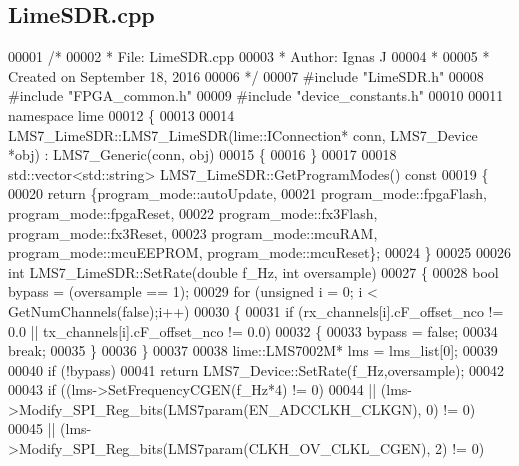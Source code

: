 \subsection{Lime\+S\+D\+R.\+cpp}
\label{LimeSDR_8cpp_source}

\begin{DoxyCode}
00001 \textcolor{comment}{/*}
00002 \textcolor{comment}{ * File:   LimeSDR.cpp}
00003 \textcolor{comment}{ * Author: Ignas J}
00004 \textcolor{comment}{ *}
00005 \textcolor{comment}{ * Created on September 18, 2016}
00006 \textcolor{comment}{ */}
00007 \textcolor{preprocessor}{#include "LimeSDR.h"}
00008 \textcolor{preprocessor}{#include "FPGA_common.h"}
00009 \textcolor{preprocessor}{#include "device_constants.h"}
00010 
00011 \textcolor{keyword}{namespace }lime
00012 \{
00013 
00014 LMS7_LimeSDR::LMS7_LimeSDR(lime::IConnection* conn, LMS7_Device *obj) : 
      LMS7_Generic(conn, obj)
00015 \{
00016 \}
00017 
00018 std::vector<std::string> LMS7_LimeSDR::GetProgramModes()\textcolor{keyword}{ const}
00019 \textcolor{keyword}{}\{
00020     \textcolor{keywordflow}{return} \{program_mode::autoUpdate,
00021             program_mode::fpgaFlash, program_mode::fpgaReset,
00022             program_mode::fx3Flash, program_mode::fx3Reset,
00023             program_mode::mcuRAM, program_mode::mcuEEPROM, 
      program_mode::mcuReset\};
00024 \}
00025 
00026 \textcolor{keywordtype}{int} LMS7_LimeSDR::SetRate(\textcolor{keywordtype}{double} f\_Hz, \textcolor{keywordtype}{int} oversample)
00027 \{
00028     \textcolor{keywordtype}{bool} bypass = (oversample == 1);
00029     \textcolor{keywordflow}{for} (\textcolor{keywordtype}{unsigned} i = 0; i < GetNumChannels(\textcolor{keyword}{false});i++)
00030     \{
00031         \textcolor{keywordflow}{if} (rx_channels[i].cF\_offset\_nco != 0.0 || tx_channels[i].cF\_offset\_nco != 0.0)
00032         \{
00033             bypass = \textcolor{keyword}{false};
00034             \textcolor{keywordflow}{break};
00035         \}
00036     \}
00037 
00038     lime::LMS7002M* lms = lms_list[0];
00039 
00040     \textcolor{keywordflow}{if} (!bypass)
00041         \textcolor{keywordflow}{return} LMS7_Device::SetRate(f\_Hz,oversample);
00042 
00043     \textcolor{keywordflow}{if} ((lms->SetFrequencyCGEN(f\_Hz*4) != 0)
00044        || (lms->Modify_SPI_Reg_bits(LMS7param(EN_ADCCLKH_CLKGN), 0) != 0)
00045        || (lms->Modify_SPI_Reg_bits(LMS7param(CLKH_OV_CLKL_CGEN), 2) != 0)

\end{DoxyCode}

